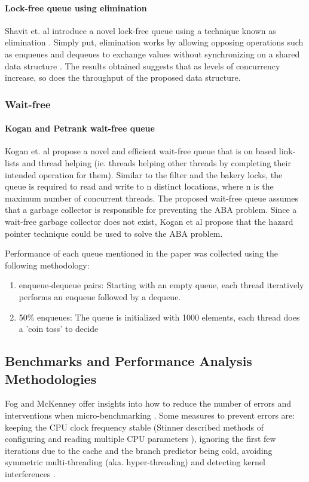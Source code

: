 \documentclass[a4paper, 12pt, titlepage]{article}
\begin{document}
\begin{singlespace}
\paragraph{Lock-free queue using elimination}
Shavit et. al introduce a novel lock-free queue using a technique known as elimination \cite{moir2005using}. Simply put, elimination works by allowing opposing operations such as enqueues and dequeues to exchange values without synchronizing on a shared data structure \cite{shavit1997elimination, moir2005using}. The results obtained suggests that as levels of concurrency increase, so does the throughput of the proposed data structure.

\subsubsection{Wait-free}
\label{wait-free-queues}

\paragraph{Kogan and Petrank wait-free queue}
\label{kp-queue}

Kogan et. al propose a novel and efficient wait-free queue that is on based link-lists and thread helping (ie. threads helping other threads by completing their intended operation for them)\cite{kogan2011wait}. Similar to the filter and the bakery locks, the queue is required to read and write to n distinct locations, where n is the maximum number of concurrent threads\cite{herlihy2020art}.
The proposed wait-free queue assumes that a garbage collector is responsible for preventing the ABA problem. Since a wait-free garbage collector does not exist, Kogan et al propose that the hazard pointer technique could be used to solve the ABA problem.

Performance of each queue mentioned in the paper was collected using the following methodology:
\begin{enumerate}
  \item enqueue-dequeue pairs: Starting with an empty queue, each thread iteratively performs an enqueue followed by a dequeue.
  \item 50\% enqueues: The queue is initialized with 1000 elements, each thread does a 'coin toss' to decide
\end{enumerate}


\subsection{Benchmarks and Performance Analysis Methodologies}
Fog and McKenney offer insights into how to reduce the number of errors and interventions when micro-benchmarking \cite{fog1996optimizing,fog2020optimizing, mckenney2017parallel}. Some measures to prevent errors are: keeping the CPU clock frequency stable (Stinner described methods of configuring and reading multiple CPU parameters \cite{stinnerpstate}), ignoring the first few iterations due to the cache and the branch predictor being cold\cite{fog1996optimizing}, avoiding symmetric multi-threading (aka. hyper-threading) \cite{fog2020optimizing} and detecting kernel interferences \cite[Chapter~11.7]{mckenney2017parallel}.


\end{singlespace}
\end{document}
